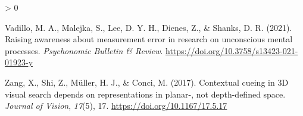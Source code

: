 \documentclass[
  english,
  man,floatsintext]{apa7}
\newlength{\cslhangindent}
\newenvironment{CSLReferences}[2] %
 {%
  \setlength{\parindent}{0pt}
  \ifodd #1 \everypar{\setlength{\hangindent}{\cslhangindent}}\ignorespaces\fi
  \ifnum #2 > 0
  \setlength{\parskip}{#2\baselineskip}
  \fi
 }%
 {}
\begin{document}
\begin{CSLReferences}{1}{0}
\leavevmode\hypertarget{ref-vadillo2021}{}%
Vadillo, M. A., Malejka, S., Lee, D. Y. H., Dienes, Z., \& Shanks, D. R. (2021). Raising awareness about measurement error in research on unconscious mental processes. \emph{Psychonomic Bulletin \& Review}. \url{https://doi.org/10.3758/s13423-021-01923-y}

\leavevmode\hypertarget{ref-zang2017}{}%
Zang, X., Shi, Z., Müller, H. J., \& Conci, M. (2017). Contextual cueing in 3D visual search depends on representations in planar-, not depth-defined space. \emph{Journal of Vision}, \emph{17}(5), 17. \url{https://doi.org/10.1167/17.5.17}

\end{CSLReferences}
\end{document}
